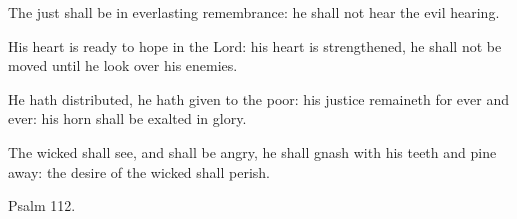 \documentclass[letterpaper,12pt]{article} %
\begin{document}
\begin{multicols}{2}
\begin{psalmverses}[0]
\item The just shall be in everlasting remembrance: he shall not hear the evil hearing.
\item His heart is ready to hope in the Lord: his heart is strengthened, he shall not be moved until he look over his enemies.
\item He hath distributed, he hath given to the poor: his justice remaineth for ever and ever: his horn shall be exalted in glory.
\item The wicked shall see, and shall be angry, he shall gnash with his teeth and pine away: the desire of the wicked shall perish.
\end{psalmverses}
\end{multicols}
\pagebreak

\large
{}
\vspace{-4ex}
\begin{center}{\Large Psalm 112.}\end{center}
\vspace{-1ex}
\normalsize
\medskip
\end{document}
